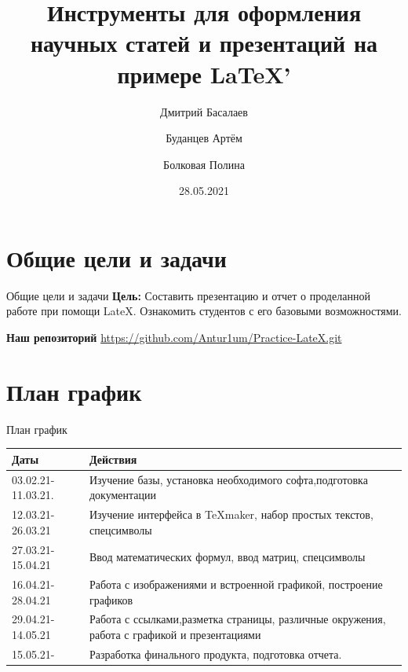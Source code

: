 \documentclass{beamer}[aspectratio=169]
\title[Презентация]{Инструменты для оформления научных статей и презентаций на примере \LaTeX'}
\institute{КемГУ}
\author{Дмитрий Басалаев \and Буданцев Артём \and Болковая Полина}
\date{28.05.2021}
\begin{document}
\newlength\someheight
\setlength\someheight{2cm}



\begin{frame}
\maketitle
\end{frame}


\section{Общие цели и задачи}
\begin{frame}{Общие цели и задачи}
\transdissolve
\textbf{Цель:} Составить презентацию и отчет о проделанной работе при помощи LateX. Ознакомить студентов с его базовыми возможностями.

\begin{center}
\textbf{Наш репозиторий}
\url{https://github.com/Antur1um/Practice-LateX.git}

\end{center}
\end{frame}

\section{План график}
\begin{frame}{План график}
\transboxout
\begin{tabular}{| l| p{6.7cm}|}
\hline {\bfseries \large Даты} & {\bfseries \large Действия}\\ \hline
03.02.21-11.03.21. & Изучение базы, установка необходимого софта,подготовка документации\\ \hline
12.03.21-26.03.21 & Изучение интерфейса в \TeX maker, набор простых текстов, спецсимволы \\ \hline
27.03.21-15.04.21 & Ввод математических формул, ввод матриц, спецсимволы  \\ \hline
16.04.21-28.04.21 & Работа с изображениями и встроенной графикой, построение графиков \\ \hline 
29.04.21-14.05.21 & Работа с ссылками,разметка страницы, различные окружения, работа с графикой и презентациями \\ \hline
15.05.21- & Разработка финального продукта, подготовка отчета. \\ \hline
\end{tabular}

\end{frame}
\end{document}
